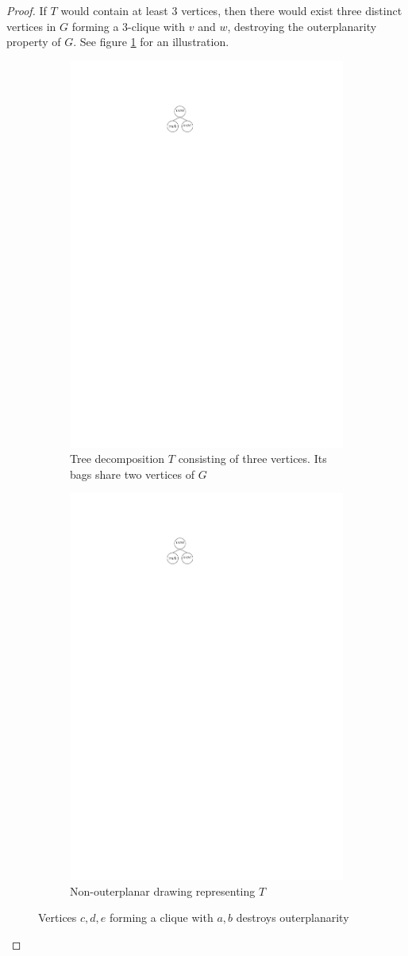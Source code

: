 \begin{proof}
	If $T$ would contain at least 3 vertices, then there would exist three distinct vertices in $G$ forming a 3-clique with $v$ and $w$, destroying the outerplanarity property of $G$. See figure \ref{im:tree_decomposition_destroying_outerplanarity} for an illustration.
			\begin{figure}[H]
		\centering
		\begin{subfigure}{0.45\textwidth}
			\centering
			\includegraphics[page=1,width=0.6\linewidth]{graphics/maximal_outerplanar_tree_decomposition.pdf}
			\caption{Tree decomposition $T$ consisting of three vertices. Its bags share two vertices of $G$}
		\end{subfigure}
	\begin{subfigure}{0.45\textwidth}
	\centering
	\includegraphics[page=2,width=0.45\linewidth]{graphics/maximal_outerplanar_tree_decomposition.pdf}
	\caption{Non-outerplanar drawing representing $T$}
\end{subfigure}
		\caption{Vertices $c,d,e$ forming a clique with $a,b$ destroys outerplanarity}\label{im:tree_decomposition_destroying_outerplanarity}
	\end{figure}
	
\end{proof}

